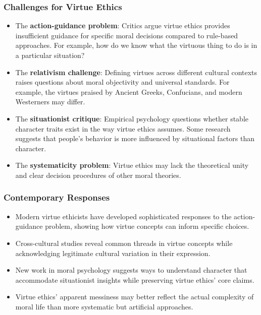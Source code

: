 \documentclass{beamer}
\begin{document}
\begin{frame}
    \frametitle{Challenges for Virtue Ethics}
    \begin{itemize}
        \item The \textbf{action-guidance problem}: Critics argue virtue ethics provides insufficient guidance for specific moral decisions compared to rule-based approaches. For example, how do we know what the virtuous thing to do is in a particular situation?
        
        \item The \textbf{relativism challenge}: Defining virtues across different cultural contexts raises questions about moral objectivity and universal standards. For example, the virtues praised by Ancient Greeks, Confucians, and modern Westerners may differ.
        
        \item The \textbf{situationist critique}: Empirical psychology questions whether stable character traits exist in the way virtue ethics assumes. Some research suggests that people's behavior is more influenced by situational factors than character.
        
        \item The \textbf{systematicity problem}: Virtue ethics may lack the theoretical unity and clear decision procedures of other moral theories.
    \end{itemize}
\end{frame}

\begin{frame}
    \frametitle{Contemporary Responses}
    \begin{itemize}
        \item Modern virtue ethicists have developed sophisticated responses to the action-guidance problem, showing how virtue concepts can inform specific choices.
        
        \item Cross-cultural studies reveal common threads in virtue concepts while acknowledging legitimate cultural variation in their expression.
        
        \item New work in moral psychology suggests ways to understand character that accommodate situationist insights while preserving virtue ethics' core claims.
        
        \item Virtue ethics' apparent messiness may better reflect the actual complexity of moral life than more systematic but artificial approaches.
    \end{itemize}
\end{frame}
\end{document}
